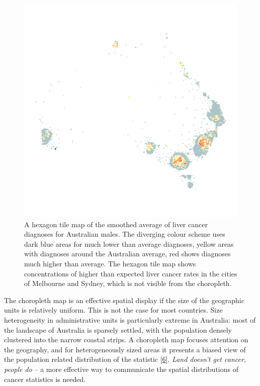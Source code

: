 \documentclass[conference,final,]{IEEEtran}
\begin{document}
\begin{figure}
\includegraphics[width=1\linewidth]{paper_files/figure-latex/liver-hex-1} \caption{A hexagon tile map of the smoothed average of liver cancer diagnoses for Australian males. The diverging colour scheme uses dark blue areas for much lower than average diagnoses, yellow areas with diagnoses around the Australian average, red shows diagnoses much higher than average. The hexagon tile map shows concentrations of higher than expected liver cancer rates in the cities of Melbourne and Sydney, which is not visible from the choropleth.}\label{fig:liver-hex}
\end{figure}

The choropleth map is an effective spatial display if the size of the geographic units is relatively uniform. This is not the case for most countries. Size heterogeneity in administrative units is particularly extreme in Australia: most of the landscape of Australia is sparsely settled, with the population densely clustered into the narrow coastal strips. A choropleth map focuses attention on the geography, and for heterogeneously sized areas it presents a biased view of the population related distribution of the statistic {[}\protect\hyperlink{ref-CBATCC}{6}{]}. \emph{Land doesn't get cancer, people do} -- a more effective way to communicate the spatial distributions of cancer statistics is needed.
\end{document}
